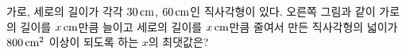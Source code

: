 \noindent\begin{minipage}[t]{0.58\linewidth}\vspace{0pt}\raggedright 가로, 세로의 길이가 각각 $30\mkern3mu \mathrm{cm}$, $60\mkern3mu \mathrm{cm}$인 직사각형이 있다. 오른쪽 그림과 같이 가로의 길이를 $x\mkern3mu \mathrm{cm}$만큼 늘이고 세로의 길이를 $x\mkern3mu \mathrm{cm}$만큼 줄여서 만든 직사각형의 넓이가 $800\mkern3mu \mathrm{cm}^2$ 이상이 되도록 하는 $x$의 최댓값은?\end{minipage}\hfill\begin{minipage}[t]{0.4\linewidth}\vspace{0pt}\centering \resizebox{\ifdim\width>\linewidth\linewidth\else\width\fi}{!}{}\end{minipage}\par
{}
